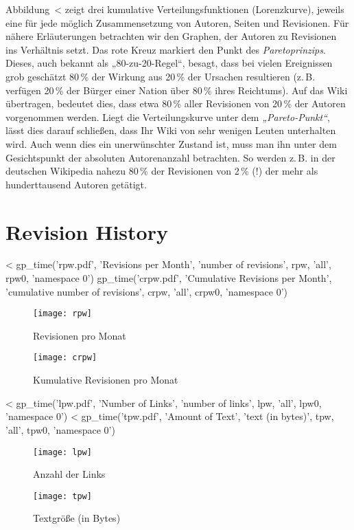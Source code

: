 \documentclass{scrartcl}
\begin{document}
Abbildung~<%
zeigt drei kumulative Verteilungsfunktionen (Lorenzkurve), jeweils eine für jede möglich Zusammensetzung von Autoren, Seiten und Revisionen.
Für nähere Erläuterungen betrachten wir den Graphen, der  Autoren zu Revisionen ins Verhältnis setzt. Das rote Kreuz markiert den Punkt des \emph{Paretoprinzips}. Dieses, auch bekannt als „80-zu-20-Regel“, besagt, dass bei vielen Ereignissen grob geschätzt 80\,\% der Wirkung aus 20\,\% der Ursachen resultieren (z.\,B. verfügen 20\,\% der Bürger einer Nation über 80\,\% ihres Reichtums). Auf das Wiki übertragen, bedeutet dies, dass etwa 80\,\% aller Revisionen von 20\,\% der Autoren vorgenommen werden. Liegt die Verteilungskurve unter dem \emph{„Pareto-Punkt“}, lässt dies darauf schließen, dass Ihr Wiki von sehr wenigen Leuten unterhalten wird. Auch wenn dies ein unerwünschter Zustand ist, muss man ihn unter dem Gesichtspunkt der absoluten Autorenanzahl betrachten. So werden z.\,B. in der deutschen Wikipedia nahezu 80\,\% der Revisionen von 2\,\% (!) der mehr als hunderttausend Autoren getätigt.



\section{Revision History} %
\label{sec:revision_history}

<%
gp_time('rpw.pdf', 'Revisions per Month', 'number of revisions', 
        rpw, 'all', rpw0, 'namespace 0')
gp_time('crpw.pdf', 'Cumulative Revisions per Month', 
        'cumulative number of revisions',
        crpw, 'all', crpw0, 'namespace 0')
\begin{figure}
	\centering
	\texttt{[image: rpw]}
	\caption{Revisionen pro Monat}
	\label{fig:revisions_per_month}
        \vfill

	\texttt{[image: crpw]}
	\caption{Kumulative Revisionen pro Monat}
	\label{fig:cumulative_revisions_per_month}
\end{figure}

<%
gp_time('lpw.pdf', 'Number of Links', 'number of links', 
        lpw, 'all', lpw0, 'namespace 0')
<%
gp_time('tpw.pdf', 'Amount of Text', 'text (in bytes)', 
        tpw, 'all', tpw0, 'namespace 0')
\begin{figure}
	\centering
	\texttt{[image: lpw]}
	\caption{Anzahl der Links}
	\label{fig:number_of_links}

	\texttt{[image: tpw]}
	\caption{Textgröße (in Bytes)}
	\label{fig:amount_of_text}
\end{figure}
\end{document}
